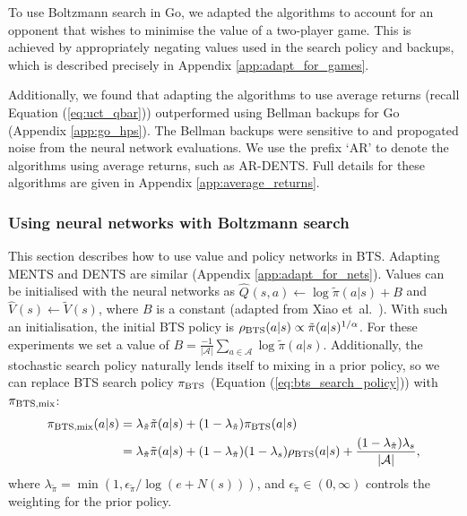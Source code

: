 \documentclass{article}
\newcommand{\etal}{et~al.\ }
\newcommand{\cl}[1]{\mathcal{#1}}
\newcommand{\Vt}[2]{\hat{V}^{#2}(#1)}
\newcommand{\Qt}[3]{\hat{Q}^{#3}(#1,#2)}
\theoremstyle{plain}
\begin{document}
        To use Boltzmann search in Go, we adapted the algorithms to account for an opponent that wishes to minimise the value of a two-player game. This is achieved by appropriately negating values used in the search policy and backups, which is described precisely in Appendix \ref{app:adapt_for_games}. 
        
        Additionally, we found that adapting the algorithms to use average returns (recall Equation (\ref{eq:uct_qbar})) outperformed using Bellman backups for Go (Appendix \ref{app:go_hps}). The Bellman backups were sensitive to and propogated noise from the neural network evaluations. We use the prefix `AR' to denote the algorithms using average returns, such as AR-DENTS. Full details for these algorithms are given in Appendix \ref{app:average_returns}.
        
        \subsubsection{Using neural networks with Boltzmann search}
            This section describes how to use value and policy networks in BTS. Adapting MENTS and DENTS are similar (Appendix \ref{app:adapt_for_nets}). Values can be initialised with the neural networks as $\Qt{s}{a}{}\leftarrow\log \tilde{\pi}(a|s)+B$ and $\Vt{s}{}\leftarrow\tilde{V}(s)$, where $B$ is a constant (adapted from Xiao \etal \cite{xiao2019maximum}). With such an initialisation, the initial BTS policy is 
            $\rho_{\textnormal{BTS}}(a|s)\propto\tilde{\pi}(a|s)^{1/\alpha}$. For these experiments we set a value of $B=\frac{-1}{|\mathcal{A}|}\sum_{a\in\mathcal{A}} \log\tilde{\pi}(a|s)$. Additionally, the stochastic search policy naturally lends itself to mixing in a prior policy, so we can replace BTS search policy $\pi_{\textnormal{BTS}}$ (Equation (\ref{eq:bts_search_policy})) with $\pi_{\textnormal{BTS,mix}}$:
            \begin{align}
                \pi_{\textnormal{BTS,mix}}(a|s) 
                &= \lambda_{\tilde{\pi}}\tilde{\pi}(a|s) + (1-\lambda_{\tilde{\pi}}) \pi_{\textnormal{BTS}}(a|s) \\
                &= \lambda_{\tilde{\pi}}\tilde{\pi}(a|s) + (1-\lambda_{\tilde{\pi}})(1-\lambda_s)\rho_{\textnormal{BTS}}(a|s) + \frac{(1-\lambda_{\tilde{\pi}})\lambda_s}{|\cl{A}|}, %
            \end{align}
            where $\lambda_{\tilde{\pi}}=\min(1,\epsilon_{\tilde{\pi}}/\log(e+N(s)))$, and $\epsilon_{\tilde{\pi}} \in (0,\infty)$ controls the weighting for the prior policy. 
\end{document}
